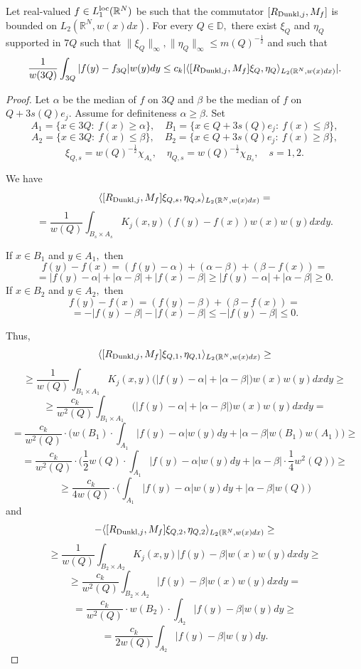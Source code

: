 \documentclass{amsart}
\begin{document}
\begin{lemma}\label{improved zhijie lemma} Let real-valued $f\in L_1^{{\rm loc}}(\mathbb{R}^N)$ be such that the commutator $[R_{{\rm Dunkl},j},M_f]$ is bounded on $L_2(\mathbb{R}^N,w(x)dx).$ For every $Q\in\mathbb{D},$ there exist $\xi_Q$ and $\eta_Q$ supported in $7Q$ such that $\|\xi_Q\|_{\infty},\|\eta_Q\|_{\infty}\leq m(Q)^{-\frac12}$ and such that
$$\frac1{w(3Q)}\int_{3Q}|f(y)-f_{3Q}|w(y)dy\leq c_k|\langle[R_{{\rm Dunkl},j},M_f]\xi_Q,\eta_Q\rangle_{L_2(\mathbb{R}^N,w(x)dx)}|.$$
\end{lemma}
\begin{proof} Let $\alpha$ be the median of $f$ on $3Q$ and $\beta$ be the median of $f$ on $Q+3s(Q)e_j.$ Assume for definiteness $\alpha\geq\beta.$ Set
$$A_1=\{x\in 3Q:\ f(x)\geq\alpha\},\quad B_1=\{x\in Q+3s(Q)e_j:\ f(x)\leq\beta\},$$
$$A_2=\{x\in 3Q:\ f(x)\leq\beta\},\quad B_2=\{x\in Q+3s(Q)e_j:\ f(x)\geq\beta\},$$
$$\xi_{Q,s}=w(Q)^{-\frac12}\chi_{A_s},\quad \eta_{Q,s}=w(Q)^{-\frac12}\chi_{B_s},\quad s=1,2.$$

We have
$$\langle[R_{{\rm Dunkl},j},M_f]\xi_{Q,s},\eta_{Q,s}\rangle_{L_2(\mathbb{R}^N,w(x)dx)}=$$
$$=\frac1{w(Q)}\int_{B_s\times A_s}K_j(x,y)(f(y)-f(x))w(x)w(y)dxdy.$$

If $x\in B_1$ and $y\in A_1,$ then
$$f(y)-f(x)=(f(y)-\alpha)+(\alpha-\beta)+(\beta-f(x))=$$
$$=|f(y)-\alpha|+|\alpha-\beta|+|f(x)-\beta|\geq |f(y)-\alpha|+|\alpha-\beta|\geq0.$$
If $x\in B_2$ and $y\in A_2,$ then
$$f(y)-f(x)=(f(y)-\beta)+(\beta-f(x))=$$
$$=-|f(y)-\beta|-|f(x)-\beta|\leq -|f(y)-\beta|\leq 0.$$

Thus,
$$\langle[R_{{\rm Dunkl},j},M_f]\xi_{Q,1},\eta_{Q,1}\rangle_{L_2(\mathbb{R}^N,w(x)dx)}\geq $$
$$\geq \frac1{w(Q)}\int_{B_1\times A_1}K_j(x,y)\big(|f(y)-\alpha|+|\alpha-\beta|\big)w(x)w(y)dxdy\geq $$
$$\geq\frac{c_k}{w^2(Q)}\int_{B_1\times A_1}\big(|f(y)-\alpha|+|\alpha-\beta|\big)w(x)w(y)dxdy=$$
$$=\frac{c_k}{w^2(Q)}\cdot\Big(w(B_1)\cdot\int_{A_1}|f(y)-\alpha|w(y)dy+|\alpha-\beta|w(B_1)w(A_1)\Big)\geq $$
$$=\frac{c_k}{w^2(Q)}\cdot\Big(\frac12w(Q)\cdot\int_{A_1}|f(y)-\alpha|w(y)dy+|\alpha-\beta|\cdot \frac14w^2(Q)\Big)\geq $$
$$\geq\frac{c_k}{4w(Q)}\cdot\Big(\int_{A_1}|f(y)-\alpha|w(y)dy+|\alpha-\beta|w(Q)\Big)$$
and
$$-\langle[R_{{\rm Dunkl},j},M_f]\xi_{Q,2},\eta_{Q,2}\rangle_{L_2(\mathbb{R}^N,w(x)dx)}\geq $$
$$\geq \frac1{w(Q)}\int_{B_2\times A_2}K_j(x,y)|f(y)-\beta|w(x)w(y)dxdy\geq $$
$$\geq\frac{c_k}{w^2(Q)}\int_{B_2\times A_2}|f(y)-\beta|w(x)w(y)dxdy=$$
$$=\frac{c_k}{w^2(Q)}\cdot w(B_2)\cdot\int_{A_2}|f(y)-\beta|w(y)dy\geq $$
$$=\frac{c_k}{2w(Q)}\int_{A_2}|f(y)-\beta|w(y)dy.$$


\end{proof}
\end{document}
